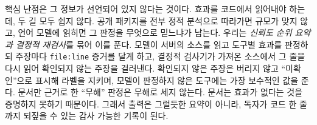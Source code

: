 \documentclass[acmsmall,screen,review,anonymous]{acmart}
\begin{document}
핵심 난점은 그 정보가 선언되어 있지 않다는 것이다. 효과를 코드에서 읽어내야 하는데, 두 길 모두 쉽지 않다. 공개 패키지를 전부 정적 분석으로 따라가면 규모가 맞지 않고, 언어 모델에 읽히면 그 판정을 무엇으로 믿느냐가 남는다. 우리는 \emph{신뢰도 순위 요약과 결정적 재검사}를 묶어 이를 푼다. 모델이 서버의 소스를 읽고 도구별 효과를 판정하되 주장마다 \texttt{file:line} 증거를 달게 하고, 결정적 검사기가 가져온 소스에서 그 줄을 다시 읽어 확인되지 않는 주장을 걸러낸다. 확인되지 않은 주장은 버리지 않고 ``미확인''으로 표시해 라벨을 지키며, 모델이 판정하지 않은 도구에는 가장 보수적인 값을 준다. 문서만 근거로 한 ``무해'' 판정은 무해로 세지 않는다. 문서는 효과가 없다는 것을 증명하지 못하기 때문이다. 그래서 출력은 그럴듯한 요약이 아니라, 독자가 코드 한 줄까지 되짚을 수 있는 감사 가능한 기록이 된다.
\end{document}

